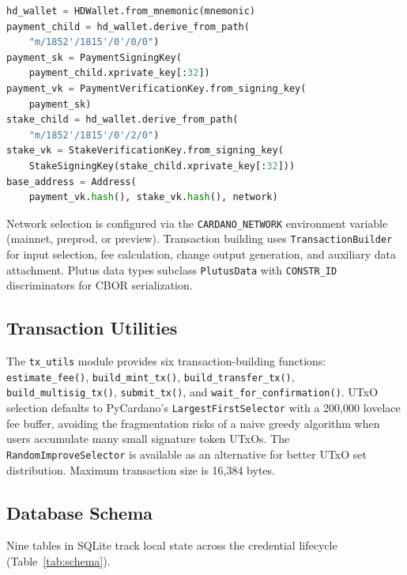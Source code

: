 \documentclass[conference,10pt]{IEEEtran}
\begin{document}
\begin{lstlisting}[language=Python, caption={HD wallet generation and address derivation}]
hd_wallet = HDWallet.from_mnemonic(mnemonic)
payment_child = hd_wallet.derive_from_path(
    "m/1852'/1815'/0'/0/0")
payment_sk = PaymentSigningKey(
    payment_child.xprivate_key[:32])
payment_vk = PaymentVerificationKey.from_signing_key(
    payment_sk)
stake_child = hd_wallet.derive_from_path(
    "m/1852'/1815'/0'/2/0")
stake_vk = StakeVerificationKey.from_signing_key(
    StakeSigningKey(stake_child.xprivate_key[:32]))
base_address = Address(
    payment_vk.hash(), stake_vk.hash(), network)
\end{lstlisting}

Network selection is configured via the \texttt{CARDANO\_NETWORK} environment variable (mainnet, preprod, or preview). Transaction building uses \texttt{TransactionBuilder} for input selection, fee calculation, change output generation, and auxiliary data attachment. Plutus data types subclass \texttt{PlutusData} with \texttt{CONSTR\_ID} discriminators for CBOR serialization.

\subsection{Transaction Utilities}

The \texttt{tx\_utils} module provides six transaction-building functions: \texttt{estimate\_fee()}, \texttt{build\_mint\_tx()}, \texttt{build\_transfer\_tx()}, \texttt{build\_multisig\_tx()}, \texttt{submit\_tx()}, and \texttt{wait\_for\_confirmation()}. UTxO selection defaults to PyCardano's \texttt{LargestFirstSelector} with a 200,000 lovelace fee buffer, avoiding the fragmentation risks of a naive greedy algorithm when users accumulate many small signature token UTxOs. The \texttt{RandomImproveSelector} is available as an alternative for better UTxO set distribution. Maximum transaction size is 16,384 bytes.

\subsection{Database Schema}

Nine tables in SQLite track local state across the credential lifecycle (Table~\ref{tab:schema}).
\end{document}
